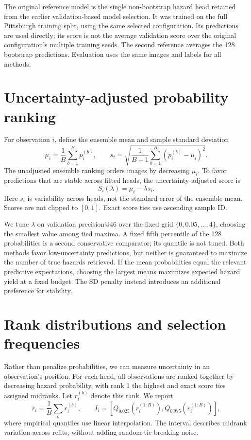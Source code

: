 \documentclass[10pt,a4paper]{article}
\begin{document}
The original reference model is the single non-bootstrap hazard head retained
from the earlier validation-based model selection. It was trained on the full
Pittsburgh training split, using the same selected configuration. Its predictions
are used directly; its score is not the average validation score over the original
configuration's multiple training seeds. The second reference averages the 128
bootstrap predictions. Evaluation uses the same images and labels for all methods.

\section{Uncertainty-adjusted probability ranking}
\label{sec:adjusted}
For observation $i$, define the ensemble mean and sample standard deviation
\begin{equation}
\mu_i=\frac{1}{B}\sum_{b=1}^{B}p_i^{(b)},\qquad
s_i=\sqrt{\frac{1}{B-1}\sum_{b=1}^{B}\left(p_i^{(b)}-\mu_i\right)^2}.
\end{equation}
The unadjusted ensemble ranking orders images by decreasing $\mu_i$. To favor
predictions that are stable across fitted heads, the uncertainty-adjusted score is
\begin{equation}
S_i(\lambda)=\mu_i-\lambda s_i.
\end{equation}
Here $s_i$ is variability across heads, not the standard error of the ensemble
mean. Scores are not clipped to $[0,1]$. Exact score ties use ascending sample ID.

We tune $\lambda$ on validation precision@46 over the fixed grid
$\{0,0.05,\ldots,4\}$, choosing the smallest value among tied maxima. A fixed fifth
percentile of the 128 probabilities is a second conservative comparator; its
quantile is not tuned. Both methods favor low-uncertainty predictions, but neither
is guaranteed to maximize the number of true hazards retrieved. If the mean
probabilities equal the relevant predictive expectations, choosing the largest
means maximizes expected hazard yield at a fixed budget. The SD penalty instead
introduces an additional preference for stability.

\section{Rank distributions and selection frequencies}
\label{sec:ranks}
Rather than penalize probabilities, we can measure uncertainty in an observation's
position. For each head, all observations are ranked together by decreasing
hazard probability, with rank 1 the highest and exact score ties assigned
midranks. Let $r_i^{(b)}$ denote this rank. We report
\begin{equation}
\overline r_i=\frac{1}{B}\sum_b r_i^{(b)},\qquad
I_i=\left[Q_{0.025}(r_i^{(1:B)}),Q_{0.975}(r_i^{(1:B)})\right],
\end{equation}
where empirical quantiles use linear interpolation. The interval describes
midrank variation across refits, without adding random tie-breaking noise.
\end{document}

